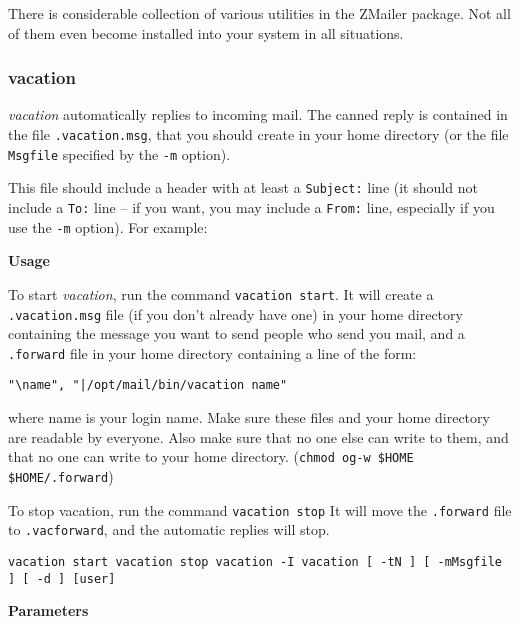 

There is considerable collection of various utilities in the
ZMailer package. Not all of them even become installed into
your system in all situations.

\subsubsection{vacation}

{\em vacation\/} automatically replies to incoming mail. The canned 
reply is contained in the file {\tt .vacation.msg}, that you should 
create in your home directory (or the file {\tt Msgfile} specified by 
the {\tt -m} option).

This file should include a header with at least a {\tt Subject:} line 
(it should not include a {\tt To:} line -- if you want, you may include 
a {\tt From:} line, especially if you use the {\tt -m} option). 
For example:

{\bf Usage}

To start {\em vacation\/}, run the command {\tt vacation start}. 
It will create a {\tt .vacation.msg} file (if you don't already 
have one) in your home directory containing the message you want to send 
people who send you mail, and a {\tt .forward} file in your home 
directory containing a line of the form:

\begin{verbatim}
"\name", "|/opt/mail/bin/vacation name"
\end{verbatim}


where name is your login name. Make sure these files and your home 
directory are readable by everyone. Also  make sure  that  no  one  
else  can  write  to  them,  and  that  no  one  can  write  to  your  
home  directory. ({\tt chmod og-w \$HOME \$HOME/.forward})

To stop vacation, run the command {\tt vacation stop} It will move the 
{\tt .forward} file to {\tt .vacforward}, and the automatic 
replies will stop.

{\tt vacation start vacation stop vacation -I vacation [ -tN ] [ -mMsgfile ] [ -d ] [user]}

{\bf Parameters}

